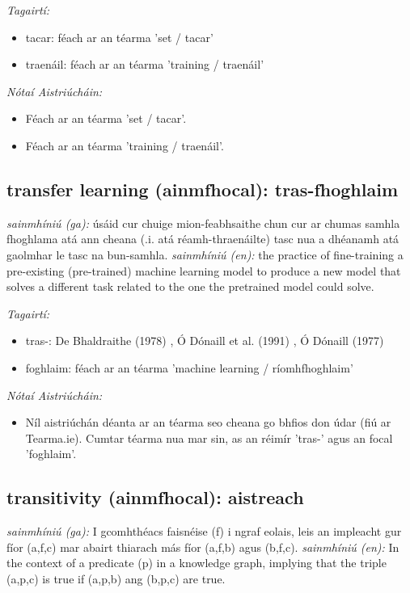 \documentclass{article}
\begin{document}
 \noindent \textit{Tagairtí:}
\begin{itemize}
	\item tacar: féach ar an téarma 'set / tacar'
	\item traenáil: féach ar an téarma 'training / traenáil'
\end{itemize}

 \noindent \textit{Nótaí Aistriúcháin:}
\begin{itemize}
	\item Féach ar an téarma 'set / tacar'.
	\item Féach ar an téarma 'training / traenáil'.
\end{itemize}


\subsection*{transfer learning (ainmfhocal): tras-fhoghlaim} 
 \noindent \textit{sainmhíniú (ga):} úsáid cur chuige mion-feabhsaithe chun cur ar chumas samhla fhoghlama atá ann cheana (.i. atá réamh-thraenáilte) tasc nua a dhéanamh atá gaolmhar le tasc na bun-samhla.
\newline\newline
 \noindent \textit{sainmhíniú (en):} the practice of fine-training a pre-existing (pre-trained) machine learning model to produce a new model that solves a different task related to the one the pretrained model could solve.
\newline

 \noindent \textit{Tagairtí:}
\begin{itemize}
	\item tras-: De Bhaldraithe (1978) \cite{de-bhaldraithe}, Ó Dónaill et al. (1991) \cite{focloir-beag}, Ó Dónaill (1977) \cite{odonaill}
	\item foghlaim: féach ar an téarma 'machine learning / ríomhfhoghlaim'
\end{itemize}

 \noindent \textit{Nótaí Aistriúcháin:}
\begin{itemize}
	\item Níl aistriúchán déanta ar an téarma seo cheana go bhfios don údar (fiú ar Tearma.ie). Cumtar téarma nua mar sin, as an réimír 'tras-' agus an focal 'foghlaim'.
\end{itemize}


\subsection*{transitivity (ainmfhocal): aistreach} 
 \noindent \textit{sainmhíniú (ga):} I gcomhthéacs faisnéise (f) i ngraf eolais, leis an impleacht gur fíor (a,f,c) mar abairt thiarach más fíor (a,f,b) agus (b,f,c).
\newline\newline
 \noindent \textit{sainmhíniú (en):} In the context of a predicate (p) in a knowledge graph, implying that the triple (a,p,c) is true if (a,p,b) ang (b,p,c) are true.
\newline
\end{document}
